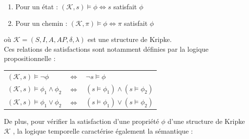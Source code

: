 \documentclass[runningheads,a4paper,10pt]{llncs}
\begin{document}
\begin{enumerate}
\item Pour un état :  $(\mathcal{K},s) \vDash \phi \Leftrightarrow s$ satisfait $\phi$ 
\item Pour un chemin : $(\mathcal{K},\pi) \vDash \phi \Leftrightarrow \pi$ satisfait $\phi$ 
\end{enumerate}

où $\mathcal{K} = (S,I,A,AP,\delta,\lambda)$ est une structure de Kripke.\\

Ces relations de satisfactions sont notamment définies par la logique propositionnelle : 

\begin{center}
\begin{tabular}{lll}
   $(\mathcal{K},s) \vDash \neg\phi$ & \hspace{0.5cm} $\Leftrightarrow$ \hspace{0.5cm} & $\neg s \vDash \phi$  \\
   $(\mathcal{K},s) \vDash \phi_{1} \wedge \phi_{2} $ & \hspace{0.5cm} $\Leftrightarrow$ \hspace{0.5cm} & $(s \vDash \phi_{1}) \wedge (s \vDash \phi_{2})$ \\
   $(\mathcal{K},s) \vDash \phi_{1} \vee \phi_{2} $ & \hspace{0.5cm} $\Leftrightarrow$ \hspace{0.5cm} & $(s \vDash \phi_{1}) \vee (s \vDash \phi_{2})$ \\
\end{tabular}
\end{center}

De plus, pour vérifier la satisfaction d'une propriété $\phi$ d'une structure de Kripke $\mathcal{K}$ , la logique temporelle caractérise également la sémantique :
\end{document}
